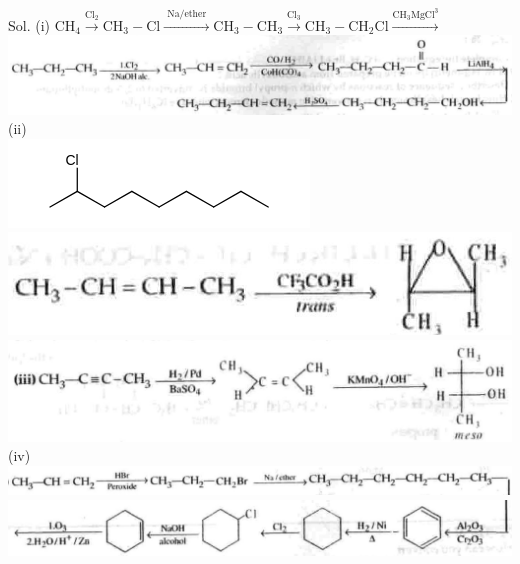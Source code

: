 \documentclass[10pt]{article}
\begin{document}
Sol. (i) $\mathrm{CH}_{4} \xrightarrow{\mathrm{Cl}_{2}} \mathrm{CH}_{3}-\mathrm{Cl} \xrightarrow{\text { Na/ether }} \mathrm{CH}_{3}-\mathrm{CH}_{3} \xrightarrow{\mathrm{Cl}_{3}} \mathrm{CH}_{3}-\mathrm{CH}_{2} \mathrm{Cl} \xrightarrow{\mathrm{CH}_{3} \mathrm{MgCl}^{3}}$\\
\includegraphics[max width=\textwidth, center]{2025_01_28_8470952b98110cec3aabg-227(4)}\\
(ii)\\
\includegraphics{smile-b8bc4f9604afa4c98e25c6a3768158e9763dbe15}\\
\includegraphics[max width=\textwidth, center]{2025_01_28_8470952b98110cec3aabg-227}\\
\includegraphics[max width=\textwidth, center]{2025_01_28_8470952b98110cec3aabg-227(8)}\\
(iv)\\
\includegraphics[max width=\textwidth, center]{2025_01_28_8470952b98110cec3aabg-227(1)}\\
\includegraphics[max width=\textwidth, center]{2025_01_28_8470952b98110cec3aabg-227(7)}\\
\end{document}

